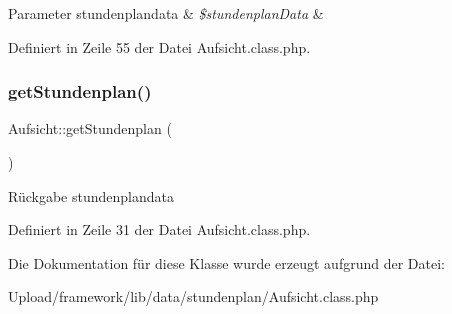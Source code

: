 \begin{DoxyParams}[1]{Parameter}
stundenplandata & {\em \$stundenplan\+Data} & \\
\hline
\end{DoxyParams}


Definiert in Zeile 55 der Datei Aufsicht.\+class.\+php.

\mbox{\label{class_aufsicht_acf1679305ef0f3b858b5e583a5df43bc}} 
\subsubsection{\texorpdfstring{get\+Stundenplan()}{getStundenplan()}}
{\footnotesize\ttfamily Aufsicht\+::get\+Stundenplan (\begin{DoxyParamCaption}{ }\end{DoxyParamCaption})}

\begin{DoxyReturn}{Rückgabe}
stundenplandata 
\end{DoxyReturn}


Definiert in Zeile 31 der Datei Aufsicht.\+class.\+php.



Die Dokumentation für diese Klasse wurde erzeugt aufgrund der Datei\+:\begin{DoxyCompactItemize}
\item 
Upload/framework/lib/data/stundenplan/Aufsicht.\+class.\+php\end{DoxyCompactItemize}
